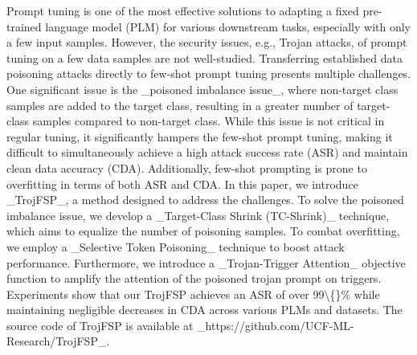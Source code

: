 Prompt tuning is one of the most effective solutions to adapting a fixed pre-trained language model (PLM) for various downstream tasks, especially with only a few input samples. However, the security issues, e.g., Trojan attacks, of prompt tuning on a few data samples are not well-studied.  Transferring established data poisoning attacks directly to few-shot prompt tuning presents multiple challenges. One significant issue is the \_poisoned imbalance issue\_, where non-target class samples are added to the target class, resulting in a greater number of target-class samples compared to non-target class. While this issue is not critical in regular tuning, it significantly hampers the few-shot prompt tuning, making it difficult to simultaneously achieve a high attack success rate (ASR) and maintain clean data accuracy (CDA). Additionally, few-shot prompting is prone to overfitting in terms of both ASR and CDA. In this paper, we introduce \_TrojFSP\_, a method designed to address the challenges. To solve the poisoned imbalance issue, we develop a \_Target-Class Shrink (TC-Shrink)\_ technique, which aims to equalize the number of poisoning samples. To combat overfitting, we employ a \_Selective Token Poisoning\_ technique to boost attack performance. Furthermore, we introduce a \_Trojan-Trigger Attention\_ objective function to amplify the attention of the poisoned trojan prompt on triggers. Experiments show that our TrojFSP achieves an ASR of over 99\textbackslash\{\}\% while maintaining negligible decreases in CDA across various PLMs and datasets. The source code of TrojFSP is available at \_https://github.com/UCF-ML-Research/TrojFSP\_.